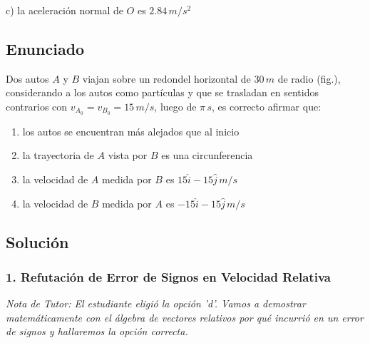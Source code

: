 \documentclass[12pt, a4paper]{article}
\begin{document}
\begin{tcolorbox}[colback=green!5!white, colframe=green!50!black, title=Respuesta Final]
\centering \Large c) la aceleración normal de $O$ es $2.84\,\si{m/s^2}$
\end{tcolorbox}

\newpage

\subsection*{Enunciado}
Dos autos $A$ y $B$ viajan sobre un redondel horizontal de $30\,\si{m}$ de radio (fig.), considerando a los autos como partículas y que se trasladan en sentidos contrarios con $v_{A_0} = v_{B_0} = 15\,\si{m/s}$, luego de $\pi\,\si{s}$, es correcto afirmar que:

\begin{center}
\end{center}

\begin{enumerate}[label=\alph*)]
    \item los autos se encuentran más alejados que al inicio
    \item la trayectoria de $A$ vista por $B$ es una circunferencia
    \item la velocidad de $A$ medida por $B$ es $15\hat{i} - 15\hat{j} \,\si{m/s}$
    \item la velocidad de $B$ medida por $A$ es $-15\hat{i} - 15\hat{j} \,\si{m/s}$
\end{enumerate}

\subsection*{Solución}

\subsubsection*{1. Refutación de Error de Signos en Velocidad Relativa}
\textit{Nota de Tutor: El estudiante eligió la opción 'd'. Vamos a demostrar matemáticamente con el álgebra de vectores relativos por qué incurrió en un error de signos y hallaremos la opción correcta.}
\end{document}
